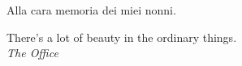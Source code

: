 \cleardoublepage
    \thispagestyle{empty}
		{\large
            \begin{flushright}
				Alla cara memoria dei miei nonni.\\
				\vspace{2em}

				There's a lot of beauty in the ordinary things.\\
				\textit{The Office}

            \end{flushright}
		}
\cleardoublepage
